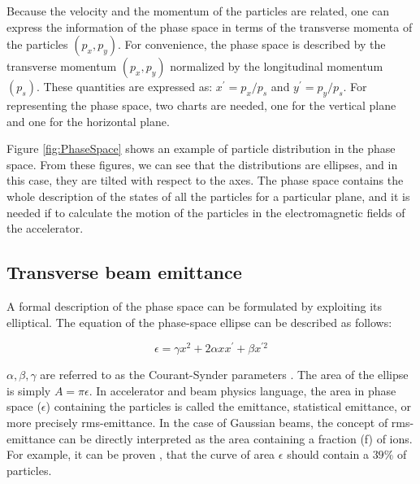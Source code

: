 Because the velocity and the momentum of the particles are related, one can express the information of the phase space in terms of the transverse momenta of the particles $\left(p_x , p_y \right)$. For convenience, the phase space is described by the transverse momentum $(p_x , p_y)$ normalized by the longitudinal momentum $(p_s)$. These quantities are expressed as: $x^{'} = p_x / p_s$ and $y^{'} = p_y / p_s$. For representing the phase space, two charts are needed, one for the vertical plane and one for the horizontal plane.

Figure \ref{fig:PhaseSpace} shows an example of particle distribution in the phase space. From these figures, we can see that the distributions are ellipses, and in this case, they are tilted with respect to the axes. The phase space contains the whole description of the states of all the particles for a particular plane, and it is needed if to calculate the motion of the particles in the electromagnetic fields of the accelerator. 

\subsection{Transverse beam emittance}
\label{subsec:TransBeamEm}

A formal description of the phase space can be formulated by exploiting its elliptical. The equation of the phase-space ellipse can be described as follows: 

\begin{equation}
    \epsilon = \gamma x^2 + 2\alpha x x^{'} + \beta x^{'2}
    \label{eq:ellipse}
\end{equation}

$\alpha, \beta, \gamma$ are referred to as the Courant-Synder parameters \parencite*[][]{ref:BookAccPhysics}. The area of the ellipse is simply $A = \pi \epsilon$. In accelerator and beam physics language, the area in phase space ($\epsilon$) containing the particles is called the emittance, statistical emittance, or more precisely rms-emittance. In the case of Gaussian beams, the concept of rms-emittance can be directly interpreted as the area containing a fraction (f) of ions. For example, it can be proven \parencite*[][]{ref:BookAccPhysics2},  that the curve of area $\epsilon$ should contain a $39\%$ of particles.

